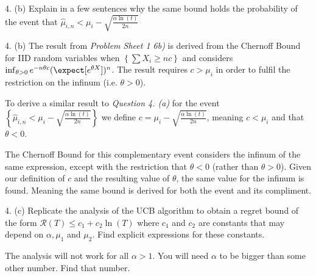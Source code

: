 \documentclass[11pt,a4paper]{article}
\begin{document}
\begin{question}{4. (b)}
  Explain in a few sentences why the same bound holds the probability of the event that $\hat\mu_{i,n}<\mu_i-\sqrt{\frac{\alpha\ln(t)}{2n}}$
\end{question}

\begin{answer}{4. (b)}
  The result from \textit{Problem Sheet 1 6b)} is derived from the Chernoff Bound for IID random variables when $\left\{\sum X_i\geq nc\right\}$ and considers $\inf_{\theta>0}e^{-n\theta c}(\expect[e^{\theta X}])^n$. The result requires $c>\mu_i$ in order to fulfil the restriction on the infinum (i.e. $\theta>0$).
  \par To derive a similar result to \textit{Question 4. (a)} for the event $\textstyle\left\{\hat\mu_{i,n}<\mu_i-\sqrt{\frac{\alpha\ln(t)}{2n}}\right\}$ we define $c=\mu_i-\sqrt{\frac{\alpha\ln(t)}{2n}}$, meaning $c<\mu_i$ and that $\theta<0$.
  \par The Chernoff Bound for this complementary event considers the infinum of the same expression, except with the restriction that $\theta<0$ (rather than $\theta>0$). Given our definition of $c$ and the resulting value of $\theta$, the same value for the infinum is found. Meaning the same bound is derived for both the event and its compliment.
\end{answer}

\begin{question}{4. (c)}
  Replicate the analysis of the UCB algorithm to obtain a regret bound of the form $\mathcal{R}(T)\leq c_1+c_2\ln(T)$ where $c_1$ and $c_2$ are constants that may depend on $\alpha,\mu_1$ and $\mu_2$. Find explicit expressions for these constants.
  \par The analysis will not work for all $\alpha>1$. You will need $\alpha$ to be bigger than some other number. Find that number.
\end{question}
\end{document}
